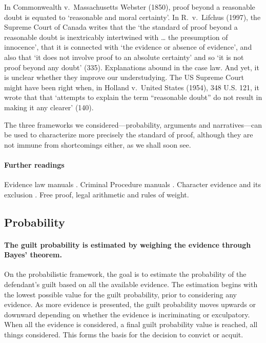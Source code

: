 \documentclass[10pt]{article}
\begin{document}
In Commonwealth v.\ Massachusetts Webster (1850), 
proof beyond a reasonable doubt is equated to 
`reasonable and moral certainty'. In R.\ v.\ Lifchus (1997),  the Supreme Court of Canada writes that 
the `the standard of proof beyond a reasonable 
doubt is inextricably intertwined with \dots 
the presumption of innocence', that it is connected with `the evidence or  
absence of evidence', and also that `it does not involve proof to an absolute certainty' and so 
`it is not proof beyond any doubt' (335). 
Explanations abound in the case law. And yet, it is unclear 
whether they improve our understudying. The US Supreme Court might have been right when, in Holland v.\ United States (1954), 348 U.S. 121, 
it wrote that that `attempts to explain the term ``reasonable doubt'' do not result in making it any clearer' (140).
 
 
The three frameworks we considered---probability, arguments and narratives---can be used to characterize 
more precisely the standard of proof, although they are not immune from shortcomings either, 
as we shall soon see.


\paragraph{Further readings}
Evidence law manuals  \citep{fisher2008,  mendez2008}. 
Criminal Procedure manuals \citep{allenEtAl2011}.
Character evidence and its exclusion \citep{redmayne2015}.
Free proof, legal arithmetic and rules of weight.
 

 
 




\subsection{Probability}


\paragraph{The guilt probability is estimated by weighing  the evidence through Bayes' theorem.}

 On the probabilistic framework, the goal is to estimate the probability of the defendant's guilt based 
 on all the available evidence. The estimation begins with the lowest possible value 
for the guilt probability, prior to considering any evidence. As more evidence is presented, the guilt probability 
moves upwards or downward depending on whether the evidence is incriminating or exculpatory. 
When all the evidence is considered, a final guilt probability value is 
reached, all things considered. This forms the basis for 
the decision to convict or acquit. 
\end{document}

